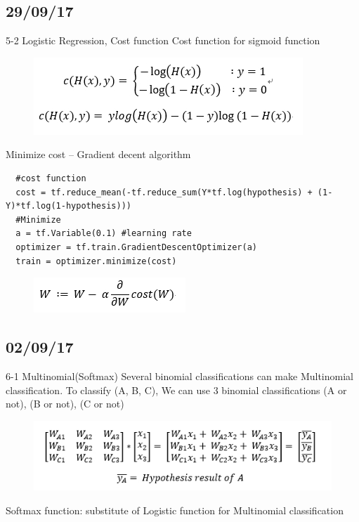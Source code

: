 \documentclass{article}
\begin{document}
\begin{CJK}{UTF8}{}
\subsection{29/09/17}
5-2 Logistic Regression, Cost function\newline
Cost function for sigmoid function\newline

\begin{figure}[h!]
\centering
\includegraphics[scale=0.6]{5.jpg}
\end{figure}
Minimize cost – Gradient decent algorithm\newline
\begin{verbatim}
  #cost function
  cost = tf.reduce_mean(-tf.reduce_sum(Y*tf.log(hypothesis) + (1-Y)*tf.log(1-hypothesis)))
  #Minimize
  a = tf.Variable(0.1) #learning rate
  optimizer = tf.train.GradientDescentOptimizer(a)
  train = optimizer.minimize(cost)
\end{verbatim}\newline
\begin{figure}[h!]
\centering
\includegraphics[scale=0.6]{6.jpg}
\end{figure}

\subsection{02/09/17}
6-1 Multinomial(Softmax)\newline
Several binomial classifications can make Multinomial classification.\newline
To classify (A, B, C), We can use 3 binomial classifications (A or not), (B or not), (C or not)\newline
\begin{figure}[h!]
\centering
\includegraphics[scale=0.6]{7.jpg}
\end{figure}
Softmax function: substitute of Logistic function for Multinomial classification\newline


\end{CJK}
\end{document}
